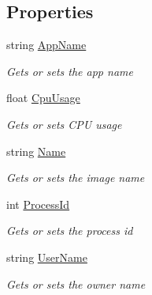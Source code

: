 \subsection*{Properties}
\begin{DoxyCompactItemize}
\item 
string \hyperlink{class_microsoft_1_1_tools_1_1_windows_device_portal_1_1_device_portal_1_1_device_process_info_ac63d9f19488faa01e454e3328edff429}{App\+Name}
\begin{DoxyCompactList}\small\item\em Gets or sets the app name \end{DoxyCompactList}\item 
float \hyperlink{class_microsoft_1_1_tools_1_1_windows_device_portal_1_1_device_portal_1_1_device_process_info_abbc79d7a408b330499d179f651f90ae7}{Cpu\+Usage}
\begin{DoxyCompactList}\small\item\em Gets or sets C\+PU usage \end{DoxyCompactList}\item 
string \hyperlink{class_microsoft_1_1_tools_1_1_windows_device_portal_1_1_device_portal_1_1_device_process_info_abeb6f417949da489c5d8c38568092f66}{Name}
\begin{DoxyCompactList}\small\item\em Gets or sets the image name \end{DoxyCompactList}\item 
int \hyperlink{class_microsoft_1_1_tools_1_1_windows_device_portal_1_1_device_portal_1_1_device_process_info_a466bcc846553a6c6b090370fc44cb677}{Process\+Id}
\begin{DoxyCompactList}\small\item\em Gets or sets the process id \end{DoxyCompactList}\item 
string \hyperlink{class_microsoft_1_1_tools_1_1_windows_device_portal_1_1_device_portal_1_1_device_process_info_a4b799bebba779e69a175dcd67515f78c}{User\+Name}
\begin{DoxyCompactList}\small\item\em Gets or sets the owner name \end{DoxyCompactList}\item 

\end{DoxyCompactItemize}
